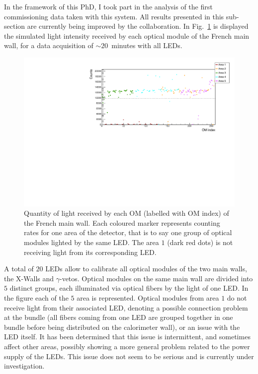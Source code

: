 In the framework of this PhD, I took part in the analysis of the first commissioning data taken with this system.
All results presented in this sub-section are currently being improved by the collaboration.
In Fig.~\ref{fig:LI_counts} is displayed the simulated light intensity received by each optical module of the French main wall, for a data acquisition of $\sim20$~minutes with all LEDs.
\begin{figure}[h!]
  \centering
  \includegraphics[width=15cm]{commissioning/fig_commissioning/LI_1d_counts.pdf}
  \caption{Quantity of light received by each OM (labelled with OM index) of the French main wall.
    Each coloured marker represents counting rates for one area of the detector, that is to say one group of optical modules lighted by the same LED.
    The area $1$ (dark red dots) is not receiving light from its corresponding LED.
    \label{fig:LI_counts}}
\end{figure}
A total of $20$ LEDs allow to calibrate all optical modules of the two main walls, the X-Walls and $\gamma$-vetos.
Optical modules on the same main wall are divided into $5$ distinct groups, each illuminated via optical fibers by the light of one LED.
In the figure each of the $5$ area is represented.
Optical modules from area $1$ do not receive light from their associated LED, denoting a possible connection problem at the bundle (all fibers coming from one LED are grouped together in one bundle before being distributed on the calorimeter wall), or an issue with the LED itself.
It has been determined that this issue is intermittent, and sometimes affect other areas, possibly showing a more general problem related to the power supply of the LEDs.
This issue does not seem to be serious and is currently under investigation.

